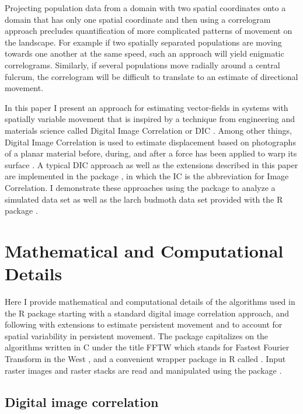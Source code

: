 Projecting population data from a domain with two spatial coordinates
onto a domain that has only one spatial coordinate and then using a
correlogram approach precludes quantification of more complicated
patterns of movement on the landscape. For example if two spatially
separated populations are moving towards one another at the same speed,
such an approach will yield enigmatic correlograms. Similarly, if
several populations move radially around a central fulcrum, the
correlogram will be difficult to translate to an estimate of directional
movement.

In this paper I present an approach for estimating vector-fields in
systems with spatially variable movement that is inspired by a technique
from engineering and materials science called Digital Image Correlation
or DIC \citep{Anuta1970, Sutton2009}. Among other things, Digital Image
Correlation is used to estimate displacement based on photographs of a
planar material before, during, and after a force has been applied to
warp its surface \citep{Sutton2009}. A typical DIC approach as well as
the extensions described in this paper are implemented in the
 package \citep{ICvf}, in which the IC is the
abbreviation for Image Correlation. I demonstrate these approaches using
the  package to analyze a simulated data set as
well as the larch budmoth data set provided with the  R
package \citep{ncf, Bjornstad2002}.

\hypertarget{mathematical-and-computational-details}{%
\section{Mathematical and Computational
Details}\label{mathematical-and-computational-details}}

Here I provide mathematical and computational details of the algorithms
used in the  R package starting with a standard
digital image correlation approach, and following with extensions to
estimate persistent movement and to account for spatial variability in
persistent movement. The  package capitalizes on
the algorithms written in C under the title FFTW which stands for
Fastest Fourier Transform in the West \citep{FFTW2005}, and a convenient
wrapper package in R called  \citep{fftwtools}. Input
raster images and raster stacks are read and manipulated using the
 package \citep{terra}.

\hypertarget{digital-image-correlation}{%
\subsection{Digital image correlation}\label{digital-image-correlation}}


